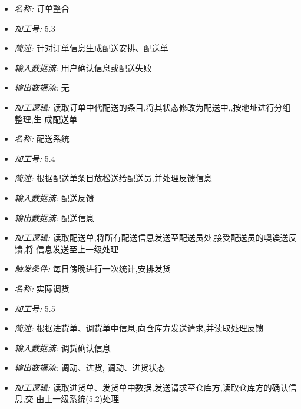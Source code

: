 \documentclass{article}
\begin{document}
\begin{CJK*}{UTF8}{gbsn}
\begin{itemize}
\end{itemize}


\vspace{-1mm}


\begin{itemize}
\item \textit{名称: }订单整合
\item \textit{加工号: } 5.3
\item \textit{简述: } 针对订单信息生成配送安排、配送单
\item \textit{输入数据流: } 用户确认信息或配送失败
\item \textit{输出数据流: } 无
\item \textit{加工逻辑: } 读取订单中代配送的条目,将其状态修改为配送中,,按地址进行分组整理,生 成配送单

\end{itemize}


\vspace{-1mm}


\begin{itemize}
\item \textit{名称: } 配送系统
\item \textit{加工号: }5.4
\item \textit{简述: } 根据配送单条目放松送给配送员,并处理反馈信息
\item \textit{输入数据流: } 配送反馈
\item \textit{输出数据流: } 配送信息
\item \textit{加工逻辑: } 读取配送单,将所有配送信息发送至配送员处,接受配送员的噢诶送反馈,将 信息发送至上一级处理
\item \textit{触发条件: }每日傍晚进行一次统计,安排发货

\end{itemize}


\vspace{-1mm}


\begin{itemize}
\item \textit{名称: } 实际调货
\item \textit{加工号: }5.5
\item \textit{简述: } 根据进货单、调货单中信息,向仓库方发送请求,并读取处理反馈
\item \textit{输入数据流: } 调货确认信息
\item \textit{输出数据流: } 调动、进货, 调动、进货状态
\item \textit{加工逻辑: } 读取进货单、发货单中数据,发送请求至仓库方,读取仓库方的确认信息,交 由上一级系统(5.2)处理


\end{itemize}
\end{CJK*}
\end{document}

